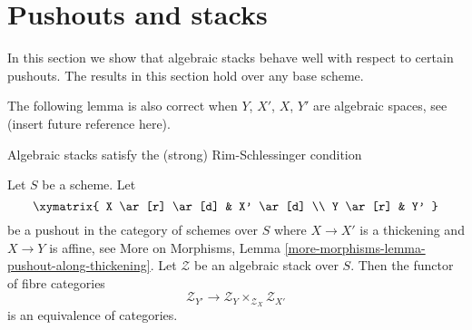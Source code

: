 \section{Pushouts and stacks}
\label{section-pushouts}

\noindent
In this section we show that algebraic stacks behave well with
respect to certain pushouts. The results in this section hold over
any base scheme.

\medskip\noindent
The following lemma is also correct when $Y$, $X'$, $X$, $Y'$ are
algebraic spaces, see (insert future reference here).

\begin{lemma}
\label{lemma-pushout}
\begin{slogan}
Algebraic stacks satisfy the (strong) Rim-Schlessinger condition
\end{slogan}
Let $S$ be a scheme. Let
$$
\xymatrix{
X \ar[r] \ar[d] & X' \ar[d] \\
Y \ar[r] & Y'
}
$$
be a pushout in the category of schemes over $S$ where $X \to X'$
is a thickening and $X \to Y$ is affine, see
More on Morphisms, Lemma \ref{more-morphisms-lemma-pushout-along-thickening}.
Let $\mathcal{Z}$ be an algebraic stack over $S$.
Then the functor of fibre categories
$$
\mathcal{Z}_{Y'}
\longrightarrow
\mathcal{Z}_Y \times_{\mathcal{Z}_X} \mathcal{Z}_{X'}
$$
is an equivalence of categories.
\end{lemma}

